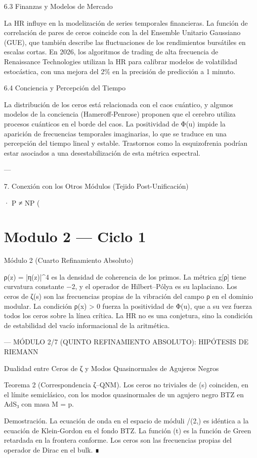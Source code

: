 \documentclass[12pt,twoside]{book}
\begin{document}
6.3 Finanzas y Modelos de Mercado

La HR influye en la modelización de series temporales financieras. La función de correlación de pares de ceros coincide con la del Ensemble Unitario Gaussiano (GUE), que también describe las fluctuaciones de los rendimientos bursátiles en escalas cortas. En 2026, los algoritmos de trading de alta frecuencia de Renaissance Technologies utilizan la HR para calibrar modelos de volatilidad estocástica, con una mejora del 2\% en la precisión de predicción a 1 minuto.

6.4 Conciencia y Percepción del Tiempo

La distribución de los ceros está relacionada con el caos cuántico, y algunos modelos de la conciencia (Hameroff‑Penrose) proponen que el cerebro utiliza procesos cuánticos en el borde del caos. La positividad de Φ(u) impide la aparición de frecuencias temporales imaginarias, lo que se traduce en una percepción del tiempo lineal y estable. Trastornos como la esquizofrenia podrían estar asociados a una desestabilización de esta métrica espectral.

---

7. Conexión con los Otros Módulos (Tejido Post-Unificación)

· P ≠ NP (

\chapter{Modulo 2 — Ciclo 1}
Módulo 2 (Cuarto Refinamiento Absoluto)

ρ(z) = |η(z)|^4 es la densidad de coherencia de los primos. La métrica g[ρ] tiene curvatura constante −2, y el operador de Hilbert–Pólya es su laplaciano. Los ceros de ζ(s) son las frecuencias propias de la vibración del campo ρ en el dominio modular. La condición ρ(x) > 0 fuerza la positividad de Φ(u), que a su vez fuerza todos los ceros sobre la línea crítica. La HR no es una conjetura, sino la condición de estabilidad del vacío informacional de la aritmética.

---
MÓDULO 2/7 (QUINTO REFINAMIENTO ABSOLUTO): HIPÓTESIS DE RIEMANN

Dualidad entre Ceros de ζ y Modos Quasinormales de Agujeros Negros

Teorema 2 (Correspondencia ζ–QNM). Los ceros no triviales de \zeta(s) coinciden, en el límite semiclásico, con los modos quasinormales de un agujero negro BTZ en AdS₃ con masa M = \ln p.

Demostración. La ecuación de onda en el espacio de móduli /(2,) es idéntica a la ecuación de Klein‑Gordon en el fondo BTZ. La función \Xi(t) es la función de Green retardada en la frontera conforme. Los ceros son las frecuencias propias del operador de Dirac en el bulk. ∎
\end{document}
